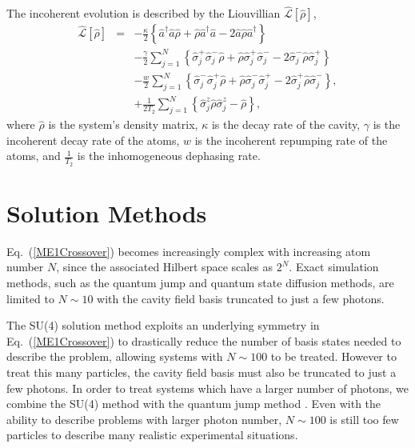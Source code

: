 \documentclass[aps,prl,twocolumn,
superscriptaddress,groupedaddress]{revtex4}
\begin{document}
The incoherent evolution is described by the Liouvillian
$\hat{\mathcal{L}}\left[ \hat{\rho} \right]$,
\begin{eqnarray}
\hat{\mathcal{L}}\left[ \hat{\rho} \right] &=&
  -\frac{\kappa}{2}
  \left\{
    \hat{a}^{\dagger} \hat{a} \hat{\rho}
    + \hat{\rho}  \hat{a}^{\dagger} \hat{a}
    - 2\hat{a} \hat{\rho} \hat{a}^{\dagger}
  \right\}
\nonumber
\\
 &&-\frac{\gamma}{2} \sum_{j=1}^N
  \left\{
   \hat{\sigma}_{j}^{+} \hat{\sigma}_{j}^{-} \hat{\rho}
   + \hat{\rho} \hat{\sigma}_{j}^{+} \hat{\sigma}_{j}^{-}
   - 2\hat{\sigma}_{j}^{-} \hat{\rho} \hat{\sigma}_{j}^{+}
  \right\}
\nonumber
\\
 &&-\frac{w}{2} \sum_{j=1}^N
  \left\{
   \hat{\sigma}_{j}^{-} \hat{\sigma}_{j}^{+} \hat{\rho}
   + \hat{\rho} \hat{\sigma}_{j}^{-} \hat{\sigma}_{j}^{+}
   - 2\hat{\sigma}_{j}^{+} \hat{\rho}  \hat{\sigma}_{j}^{-}
  \right\},
\nonumber
\\
 &&+\frac{1}{2T_2} \sum_{j=1}^N
  \left\{
   \hat{\sigma}_{j}^{z} \hat{\rho}  \hat{\sigma}_{j}^{z} - \hat{\rho}
  \right\},
\end{eqnarray}
where $\hat{\rho}$ is the system's density matrix, $\kappa$ is the decay
rate of the cavity, $\gamma$ is the incoherent decay rate of the atoms,
$w$ is the incoherent repumping rate of the atoms, and $\frac{1}{T_2}$
is the inhomogeneous dephasing rate.


\section{Solution Methods}

Eq.~(\ref{ME1Crossover}) becomes increasingly complex with increasing
atom number $N$, since the associated Hilbert space scales as $2^N$.
Exact simulation methods, such as the quantum jump and quantum state
diffusion methods, are limited to $N\sim10$ with the cavity field basis
truncated to just a few photons.

The SU(4) solution method \cite{Hartmann:arXiv1201.1732}
\cite{Holland13} exploits an underlying symmetry in
Eq.~(\ref{ME1Crossover}) to drastically reduce the number of basis
states needed to describe the problem, allowing systems with $N\sim100$
to be treated. However to treat this many particles, the cavity field
basis must also be truncated to just a few photons. In order to treat
systems which have a larger number of photons, we combine the SU(4)
method with the quantum jump method \cite{Dalibard92} \cite{Dum92}
\cite{Knight98}. Even with the ability to describe problems with larger
photon number, $N\sim100$ is still too few particles to describe many
realistic experimental situations.
\end{document}
